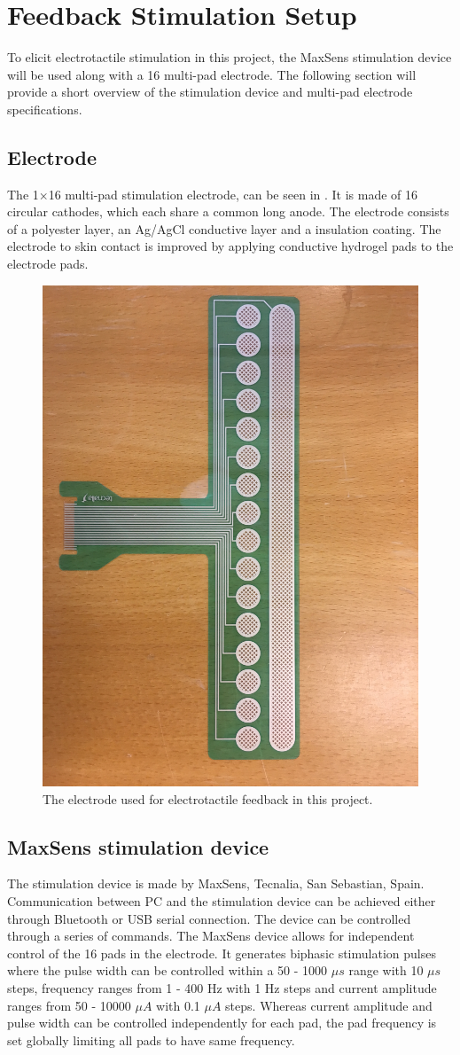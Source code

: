 \section{Feedback Stimulation Setup}

To elicit electrotactile stimulation in this project, the MaxSens stimulation device will be used along with a 16 multi-pad electrode. The following section will provide a short overview of the stimulation device and multi-pad electrode specifications. 
 

\subsection{Electrode}

The 1$\times$16 multi-pad stimulation electrode, can be seen in . It is made of 16 circular cathodes, which each share a common long anode. The electrode consists of a polyester layer, an Ag/AgCl conductive layer and a insulation coating. The electrode to skin contact is improved by applying conductive hydrogel pads to the electrode pads. \cite{Strbac2016}     

\begin{figure}[H]                 
	\includegraphics[width=.4\textwidth]{figures/electrode}  
	\caption{The electrode used for electrotactile feedback in this project.}
	\label{fig:electrode} 
\end{figure}


\subsection{MaxSens stimulation device}

The stimulation device is made by MaxSens, Tecnalia, San Sebastian, Spain. Communication between PC and the stimulation device can be achieved either through Bluetooth or USB serial connection. The device can be controlled through a series of commands. The MaxSens device allows for independent control of the 16 pads in the electrode. It generates biphasic stimulation pulses where the pulse width can be controlled within a 50 - 1000 $\mu s$ range with 10 $\mu s$ steps, frequency ranges from 1 - 400 Hz with 1 Hz steps and current amplitude ranges from 50 - 10000 $\mu A$ with 0.1 $\mu A$ steps. Whereas current amplitude and pulse width can be controlled independently for each pad, the pad frequency is set globally limiting all pads to have same frequency.    